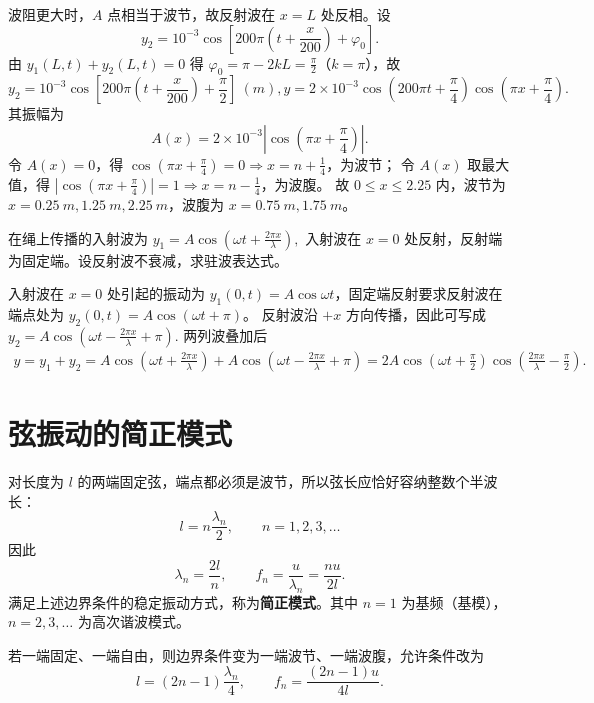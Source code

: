 \documentclass[lang=cn,11pt]{elegantbook}
\begin{document}
\begin{solution}
波阻更大时，\(A\) 点相当于波节，故反射波在 \(x=L\) 处反相。设
\[
y_2=10^{-3}\cos\!\left[200\pi\left(t+\frac{x}{200}\right)+\varphi_0\right].
\]
由 \(y_1(L,t)+y_2(L,t)=0\) 得 \(\varphi_0=\pi-2kL=\frac{\pi}{2}\)（\(k=\pi\)），故
\[
y_2=10^{-3}\cos\!\left[200\pi\left(t+\frac{x}{200}\right)+\frac{\pi}{2}\right]\ (\si{m}),
y=2\times10^{-3}\cos\!\left(200\pi t+\frac{\pi}{4}\right)\cos\!\left(\pi x+\frac{\pi}{4}\right).
\]
其振幅为
\[
A(x)=2\times10^{-3}\left|\cos\!\left(\pi x+\frac{\pi}{4}\right)\right|.
\]
令 \(A(x)=0\)，得 \(\cos\!\left(\pi x+\frac{\pi}{4}\right)=0\Rightarrow x=n+\frac14\)，为波节；
令 \(A(x)\) 取最大值，得 \(\left|\cos\!\left(\pi x+\frac{\pi}{4}\right)\right|=1\Rightarrow x=n-\frac14\)，为波腹。
故 \(0\le x\le2.25\) 内，波节为 \(x=\SI{0.25}{m},\SI{1.25}{m},\SI{2.25}{m}\)，波腹为 \(x=\SI{0.75}{m},\SI{1.75}{m}\)。
\end{solution}

\begin{exercise}
在绳上传播的入射波为
 \(y_1=A\cos\left(\omega t+\frac{2\pi x}{\lambda}\right),\) 
入射波在 \(x=0\) 处反射，反射端为固定端。设反射波不衰减，求驻波表达式。
\end{exercise}
\begin{solution}
入射波在 \(x=0\) 处引起的振动为 \(y_1(0,t)=A\cos\omega t\)，固定端反射要求反射波在端点处为 \(y_2(0,t)=A\cos(\omega t+\pi)\)。
反射波沿 \(+x\) 方向传播，因此可写成
 \(y_2=A\cos\left(\omega t-\frac{2\pi x}{\lambda}+\pi\right).\) 
两列波叠加后
\[
\begin{aligned}
y=y_1+y_2=A\cos\left(\omega t+\frac{2\pi x}{\lambda}\right)
+A\cos\left(\omega t-\frac{2\pi x}{\lambda}+\pi\right)=2A\cos\left(\omega t+\frac{\pi}{2}\right)
\cos\left(\frac{2\pi x}{\lambda}-\frac{\pi}{2}\right).
\end{aligned}
\]
\end{solution}

\section{弦振动的简正模式}

\begin{definition}[简正模式]
对长度为 \(l\) 的两端固定弦，端点都必须是波节，所以弦长应恰好容纳整数个半波长：
\[
l=n\frac{\lambda_n}{2},\qquad n=1,2,3,\dots
\]
因此
\[
\lambda_n=\frac{2l}{n},\qquad f_n=\frac{u}{\lambda_n}=\frac{nu}{2l}.
\]
满足上述边界条件的稳定振动方式，称为\textbf{简正模式}。其中 \(n=1\) 为基频（基模），\(n=2,3,\dots\) 为高次谐波模式。

若一端固定、一端自由，则边界条件变为一端波节、一端波腹，允许条件改为
\[
l=(2n-1)\frac{\lambda_n}{4},\qquad f_n=\frac{(2n-1)u}{4l}.
\]
\end{definition}
\end{document}
